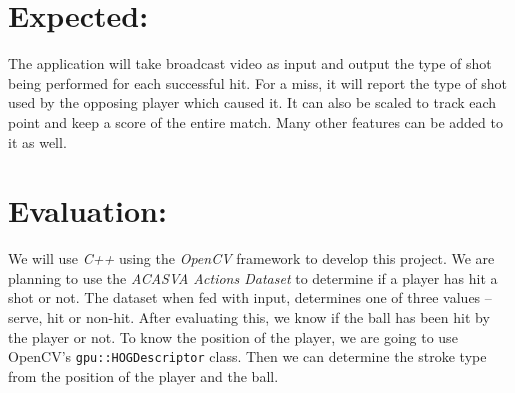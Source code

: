 \documentclass[10.5pt]{proc}
\begin{document}
    \section{Expected:}
    The application will take broadcast video as input and output the type of shot being performed for each successful hit. For a miss, it will report the type of shot used by the opposing player which caused it. It can also be scaled to track each point and keep a score of the entire match. Many other features can be added to it as well.
    
    \section{Evaluation:}
    We will use \textit{C++} using the \textit{OpenCV} framework to develop this project. We are planning to use the \textit{ACASVA Actions Dataset}\cite{acasva} to determine if a player has hit a shot or not. The dataset when fed with input, determines one of three values -- serve, hit or non-hit. After evaluating this, we know if the ball has been hit by the player or not. To know the position of the player, we are going to use OpenCV's \texttt{gpu::HOGDescriptor}\cite{hog} class. Then we can determine the stroke type from the position of the player and the ball.
\end{document}
